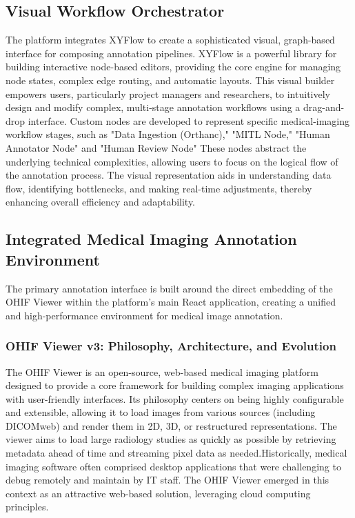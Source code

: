 \subsection{Visual Workflow Orchestrator}
The platform integrates XYFlow to create a sophisticated visual, graph-based interface for composing annotation pipelines. XYFlow is a powerful library for building interactive node-based editors, providing the core engine for managing node states, complex edge routing, and automatic layouts. This visual builder empowers users, particularly project managers and researchers, to intuitively design and modify complex, multi-stage annotation workflows using a drag-and-drop interface. Custom nodes are developed to represent specific medical-imaging workflow stages, such as "Data Ingestion (Orthanc)," "MITL Node," "Human Annotator Node" and "Human Review Node" These nodes abstract the underlying technical complexities, allowing users to focus on the logical flow of the annotation process. The visual representation aids in understanding data flow, identifying bottlenecks, and making real-time adjustments, thereby enhancing overall efficiency and adaptability.

\subsection{Integrated Medical Imaging Annotation Environment}
The primary annotation interface is built around the direct embedding of the OHIF Viewer within the platform's main React application, creating a unified and high-performance environment for medical image annotation.
\subsubsection*{OHIF Viewer v3: Philosophy, Architecture, and Evolution}
The OHIF Viewer is an open-source, web-based medical imaging platform designed to provide a core framework for building complex imaging applications with user-friendly interfaces. Its philosophy centers on being highly configurable and extensible, allowing it to load images from various sources (including DICOMweb) and render them in 2D, 3D, or restructured representations. The viewer aims to load large radiology studies as quickly as possible by retrieving metadata ahead of time and streaming pixel data as needed.Historically, medical imaging software often comprised desktop applications that were challenging to debug remotely and maintain by IT staff. The OHIF Viewer emerged in this context as an attractive web-based solution, leveraging cloud computing principles.
